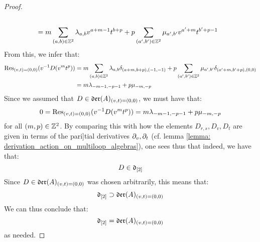 \begin{proof}
$$\begin{aligned}
                            \\
                            & = m \sum_{(a, b) \in \mathbb{Z}^2} \lambda_{a, b} v^{a + m - 1} t^{b + p} + p \sum_{(a', b') \in \mathbb{Z}^2} \mu_{a', b'} v^{a' + m} t^{b' + p - 1}
                        \end{aligned}
                    $$
                From this, we infer that:
                    $$
                        \begin{aligned}
                            \mathrm{Res}_{(v, t) = (0, 0)}( v^{-1} D(v^m t^p) ) & = m \sum_{(a, b) \in \mathbb{Z}^2} \lambda_{a, b} \delta_{(a + m, b + p), (-1, -1)} + p \sum_{(a', b') \in \mathbb{Z}^2} \mu_{a', b'} \delta_{(a' + m, b' + p), (0, 0)}
                            \\
                            & = m \lambda_{-m - 1, -p - 1} + p \mu_{-m, -p}
                        \end{aligned}
                    $$
                Since we assumed that $D \in \mathfrak{der}(A)_{(v, t) = (0, 0)}$, we must have that:
                    $$0 = \mathrm{Res}_{(v, t) = (0, 0)}( v^{-1} D(v^m t^p) ) = m \lambda_{-m - 1, -p - 1} + p \mu_{-m, -p}$$
                for all $(m, p) \in \mathbb{Z}^2$. By comparing this with how the elements $D_{r, s}, D_v, D_t$ are given in terms of the pari]tial derivatives $\partial_v, \partial_t$ (cf. lemma \ref{lemma: derivation_action_on_multiloop_algebras}), one sees thus that indeed, we have that:
                    $$D \in \mathfrak{d}_{[2]}$$
                Since $D \in \mathfrak{der}(A)_{(v, t) = (0, 0)}$ was chosen arbitrarily, this means that:
                    $$\mathfrak{d}_{[2]} \supset \mathfrak{der}(A)_{(v, t) = (0, 0)}$$
                We can thus conclude that:
                    $$\mathfrak{d}_{[2]} = \mathfrak{der}(A)_{(v, t) = (0, 0)}$$
                as needed.
            \end{proof}

